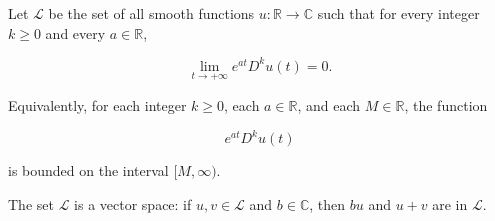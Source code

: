 Let $\mathcal{L}$ be the set of all smooth functions $u: \mathbb{R} \to \mathbb{C}$ such that for every integer $k \geq 0$ and every $a \in \mathbb{R}$,

$$\lim_{t \to +\infty} e^{at} D^{k} u(t) = 0.$$

Equivalently, for each integer $k \geq 0$, each $a \in \mathbb{R}$, and each $M \in \mathbb{R}$, the function

$$e^{at} D^{k} u(t)$$

is bounded on the interval $[M, \infty)$.

The set $\mathcal{L}$ is a vector space: if $u, v \in \mathcal{L}$ and $b \in \mathbb{C}$, then $bu$ and $u + v$ are in $\mathcal{L}$.
